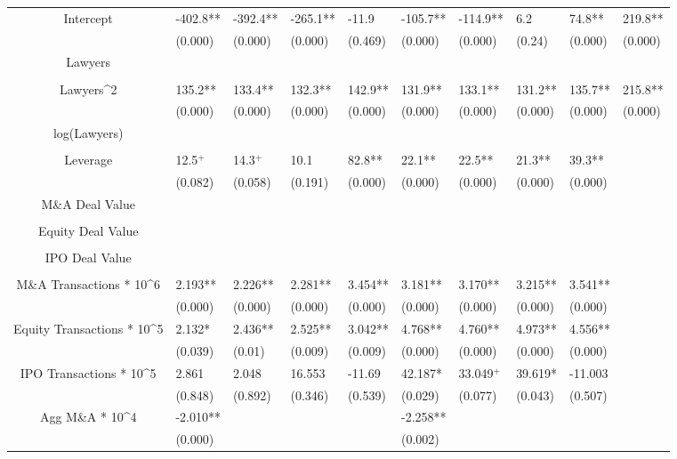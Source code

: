 \documentclass{article}
\begin{document}
\begin{table}[H]
\begin{tabular}{|clllllllll|}
Intercept & -402.8** & -392.4** & -265.1** & -11.9 & -105.7** & -114.9** & 6.2 & 74.8** & 219.8** \\ 
   & (0.000) & (0.000) & (0.000) & (0.469) & (0.000) & (0.000) & (0.24) & (0.000) & (0.000) \\ 
  Lawyers &  &  &  &  &  &  &  &  &  \\ 
   &  &  &  &  &  &  &  &  &  \\ 
  Lawyers^2 & 135.2** & 133.4** & 132.3** & 142.9** & 131.9** & 133.1** & 131.2** & 135.7** & 215.8** \\ 
   & (0.000) & (0.000) & (0.000) & (0.000) & (0.000) & (0.000) & (0.000) & (0.000) & (0.000) \\ 
  log(Lawyers) &  &  &  &  &  &  &  &  &  \\ 
   &  &  &  &  &  &  &  &  &  \\ 
  Leverage & 12.5$^{+}$ & 14.3$^{+}$ & 10.1 & 82.8** & 22.1** & 22.5** & 21.3** & 39.3** &  \\ 
   & (0.082) & (0.058) & (0.191) & (0.000) & (0.000) & (0.000) & (0.000) & (0.000) &  \\ 
  M\&A Deal Value &  &  &  &  &  &  &  &  &  \\ 
   &  &  &  &  &  &  &  &  &  \\ 
  Equity Deal Value &  &  &  &  &  &  &  &  &  \\ 
   &  &  &  &  &  &  &  &  &  \\ 
  IPO Deal Value &  &  &  &  &  &  &  &  &  \\ 
   &  &  &  &  &  &  &  &  &  \\ 
  M\&A Transactions * 10^6 & 2.193** & 2.226** & 2.281** & 3.454** & 3.181** & 3.170** & 3.215** & 3.541** &  \\ 
   & (0.000) & (0.000) & (0.000) & (0.000) & (0.000) & (0.000) & (0.000) & (0.000) &  \\ 
  Equity Transactions * 10^5 & 2.132* & 2.436** & 2.525** & 3.042** & 4.768** & 4.760** & 4.973** & 4.556** &  \\ 
   & (0.039) & (0.01) & (0.009) & (0.009) & (0.000) & (0.000) & (0.000) & (0.000) &  \\ 
  IPO Transactions * 10^5 & 2.861 & 2.048 & 16.553 & -11.69 & 42.187* & 33.049$^{+}$ & 39.619* & -11.003 &  \\ 
   & (0.848) & (0.892) & (0.346) & (0.539) & (0.029) & (0.077) & (0.043) & (0.507) &  \\ 
  Agg M\&A * 10^4 & -2.010** &  &  &  & -2.258** &  &  &  &  \\ 
   & (0.000) &  &  &  & (0.002) &  &  &  &  \\ 

\end{tabular}
\end{table}
\end{document}
